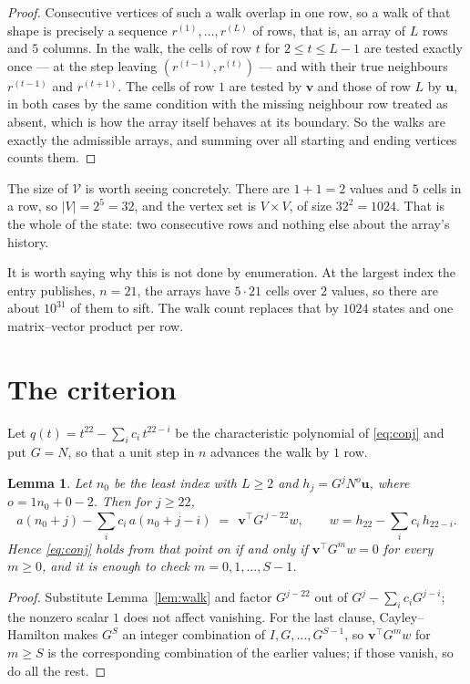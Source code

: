 \documentclass[11pt,a4paper]{article}
\theoremstyle{plain}
\newtheorem{lemma}[theorem]{Lemma}
\theoremstyle{definition}
\begin{document}
\begin{proof}
Consecutive vertices of such a walk overlap in one row, so a walk of that shape is
precisely a sequence $r^{(1)},\dots,r^{(L)}$ of rows, that is, an array of $L$ rows
and $5$ columns. In the walk, the cells of row $t$ for $2\le t\le L-1$ are tested
exactly once --- at the step leaving $(r^{(t-1)},r^{(t)})$ --- and with their true
neighbours $r^{(t-1)}$ and $r^{(t+1)}$. The cells of row $1$ are tested by
$\mathbf{v}$ and those of row $L$ by $\mathbf{u}$, in both cases by the same condition
with the missing neighbour row treated as absent, which is how the array itself behaves at
its boundary. So the walks are exactly the admissible arrays, and summing over all starting
and ending vertices counts them.
\end{proof}


The size of $\mathcal V$ is worth seeing concretely. There are $1+1=2$ values
and $5$ cells in a row, so $|V|=2^{5}=32$, and the vertex set is
$V\times V$, of size $32^2=1024$. That is the whole of the state: two consecutive
rows and nothing else about the array's history.

It is worth saying why this is not done by enumeration. At the largest index the entry
publishes, $n=21$, the arrays have $5\cdot21$ cells over
$2$ values, so there are about $10^{31}$ of them to sift. The
walk count replaces that by $1024$ states and one matrix--vector product per row.
\section{The criterion}

Let $q(t)=t^{22}-\sum_i c_i\,t^{22-i}$ be the characteristic polynomial of
\eqref{eq:conj} and put $G=N$, so that a unit step in $n$ advances the walk by
$1$ row.

\begin{lemma}\label{lem:crit}
Let $n_0$ be the least index with $L\ge2$ and $h_j=G^{j}N^{o}\mathbf{u}$, where
$o=1n_0+0-2$. Then for $j\ge22$,
\[
a(n_0+j)-\sum_i c_i\,a(n_0+j-i)\;=\;\,\mathbf{v}^{\!\top}G^{\,j-22}w,
\qquad w=h_{22}-\sum_i c_i\,h_{22-i} .
\]
Hence \eqref{eq:conj} holds from that point on if and only if
$\mathbf{v}^{\!\top}G^{m}w=0$ for every $m\ge0$, and it is enough to check
$m=0,1,\dots,S-1$.
\end{lemma}

\begin{proof}
Substitute Lemma~\ref{lem:walk} and factor $G^{j-22}$ out of
$G^{j}-\sum_ic_iG^{j-i}$; the nonzero scalar $1$ does not affect
vanishing. For the last clause, Cayley--Hamilton makes $G^{S}$ an integer combination of
$I,G,\dots,G^{S-1}$, so $\mathbf{v}^{\!\top}G^{m}w$ for $m\ge S$ is the corresponding
combination of the earlier values; if those vanish, so do all the rest.
\end{proof}
\end{document}
